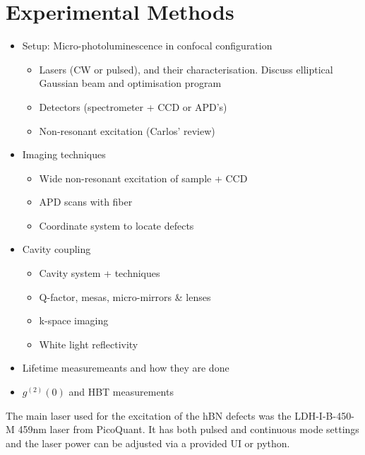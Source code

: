 \section{Experimental Methods}

\begin{itemize}
    \item Setup: Micro-photoluminescence in confocal configuration 
    \begin{itemize}
        \item Lasers (CW or pulsed), and their characterisation. Discuss elliptical Gaussian beam and optimisation program
        \item Detectors (spectrometer + CCD or APD's)
        \item Non-resonant excitation (Carlos' review)
    \end{itemize}
    \item Imaging techniques
    \begin{itemize}
        \item Wide non-resonant excitation of sample + CCD
        \item APD scans with fiber
        \item Coordinate system to locate defects
    \end{itemize}
    \item Cavity coupling 
    \begin{itemize}
        \item Cavity system + techniques 
        \item Q-factor, mesas, micro-mirrors \& lenses
        \item k-space imaging 
        \item White light reflectivity
    \end{itemize}
    \item Lifetime measuremeants and how they are done
    \item $g^{(2)}(0)$ and HBT measurements
\end{itemize}

The main laser used for the excitation of the hBN defects was the LDH-I-B-450-M 459nm laser from PicoQuant. It has both pulsed and continuous mode settings and the laser power can be adjusted via a provided UI or python.